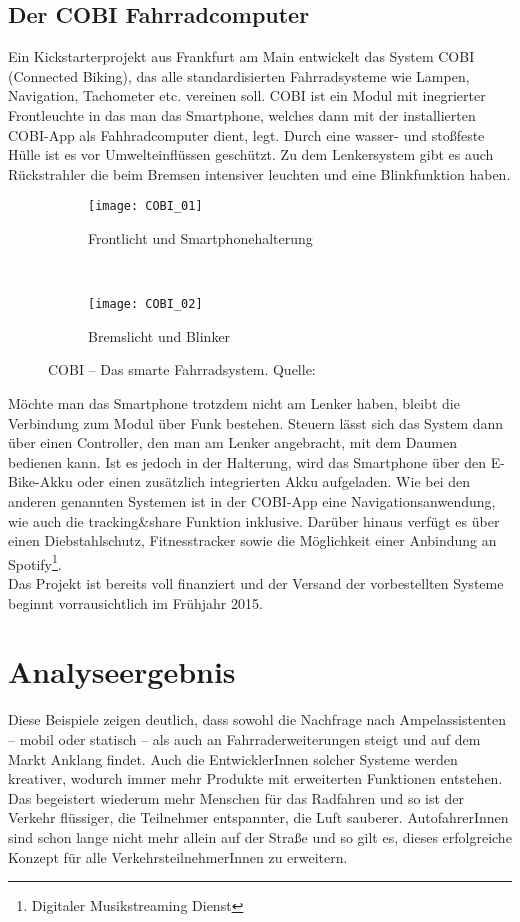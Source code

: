 \subsection{Der COBI Fahrradcomputer}
Ein Kickstarterprojekt aus Frankfurt am Main entwickelt das System \textsc{COBI} (Connected Biking), das alle standardisierten Fahrradsysteme wie Lampen, Navigation, Tachometer etc. vereinen soll. \textsc{COBI} ist ein Modul mit inegrierter Frontleuchte in das man das Smartphone, welches dann mit der installierten \textsc{COBI}-App als Fahhradcomputer dient, legt. Durch eine wasser- und stoßfeste Hülle ist es vor Umwelteinflüssen geschützt. Zu dem Lenkersystem gibt es auch Rückstrahler die beim Bremsen intensiver leuchten und eine Blinkfunktion haben.
\begin{figure}
        \centering
        \begin{subfigure}[b]{0.49\textwidth}
                \texttt{[image: COBI\_01]}
                \caption{Frontlicht und Smartphonehalterung}
                \label{fig:cobi1}
        \end{subfigure}%
        ~ %
        \begin{subfigure}[b]{0.49\textwidth}
                \texttt{[image: COBI\_02]}
                \caption{Bremslicht und Blinker}
                \label{fig:cobi2}
        \end{subfigure}
        \caption[COBI]{COBI -- Das smarte Fahrradsystem. Quelle: \cite{cobi_pic}}
        \label{fig:cobi}
\end{figure}
Möchte man das Smartphone trotzdem nicht am Lenker haben, bleibt die Verbindung zum Modul über Funk bestehen. Steuern lässt sich das System dann über einen Controller, den man am Lenker angebracht, mit dem Daumen bedienen kann. Ist es jedoch in der Halterung, wird das Smartphone über den E-Bike-Akku oder einen zusätzlich integrierten Akku aufgeladen. Wie bei den anderen genannten Systemen ist in der \textsc{COBI}-App eine Navigationsanwendung, wie auch die tracking\&share Funktion inklusive. Darüber hinaus verfügt es über einen Diebstahlschutz, Fitnesstracker sowie die Möglichkeit einer Anbindung an Spotify\footnote{ Digitaler Musikstreaming Dienst}.\\
Das Projekt ist bereits voll finanziert und der Versand der vorbestellten Systeme beginnt vorrausichtlich im Frühjahr 2015\cite{cobi}.
\section{Analyseergebnis}
Diese Beispiele zeigen deutlich, dass sowohl die Nachfrage nach Ampelassistenten -- mobil oder statisch -- als auch an Fahrraderweiterungen steigt und auf dem Markt Anklang findet. Auch die EntwicklerInnen solcher Systeme werden kreativer, wodurch immer mehr Produkte mit erweiterten Funktionen entstehen. Das begeistert wiederum mehr Menschen für das Radfahren und so ist der Verkehr flüssiger, die Teilnehmer entspannter, die Luft sauberer. AutofahrerInnen sind schon lange nicht mehr allein auf der Straße und so gilt es, dieses erfolgreiche Konzept für alle VerkehrsteilnehmerInnen zu erweitern.
